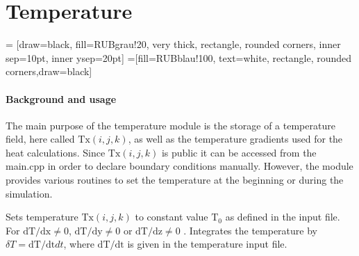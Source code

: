 \section{Temperature}
\label{sec:module_temperature}
 = [draw=black, fill=RUBgrau!20, very thick, rectangle, rounded corners, inner sep=10pt, inner ysep=20pt]
 =[fill=RUBblau!100, text=white, rectangle, rounded corners,draw=black]

\paragraph{Background and usage} The main purpose of the temperature module is the storage of a temperature field, here called $\mathrm{Tx}(i,j,k)$, as well as the temperature gradients used for the heat calculations. Since $\mathrm{Tx}(i,j,k)$ is public it can be accessed from the main.cpp in order to declare boundary conditions manually. However, the module provides various routines to set the temperature at the beginning or during the simulation.

\begin{description}[font=\sffamily, font=\normalsize]
   Sets temperature $\mathrm{Tx}(i,j,k)$ to constant value $\mathrm{T_0}$ as defined in the input file. For $\mathrm{dT/dx} \neq 0$, $\mathrm{dT/dy} \neq 0$ or $\mathrm{dT/dz} \neq 0$ .
   Integrates the temperature by $\delta T = \mathrm{dT/dt} dt$, where $\mathrm{dT/dt}$ is given in the temperature input file.
\end{description}

